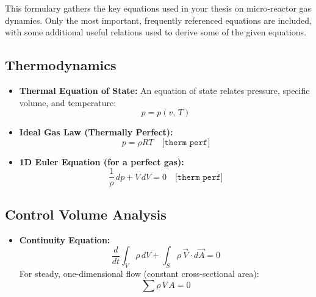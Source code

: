 This formulary gathers the key equations used in your thesis on micro-reactor gas dynamics.
Only the most important, frequently referenced equations are included, with some additional useful relations used to derive some of the given equations.

\subsection*{Thermodynamics}
\begin{itemize}
    \item \textbf{Thermal Equation of State:}  
    An equation of state relates pressure, specific volume, and temperature:
    $$
	    p = p(v,\,T)
    $$
    \item \textbf{Ideal Gas Law (Thermally Perfect):}  
    $$
	    p = \rho R T \quad \texttt{[therm perf]}
    $$
    \item \textbf{1D Euler Equation (for a perfect gas):}  
    $$
	    \frac{1}{\rho}\,dp + V\,dV = 0 \quad \texttt{[therm perf]}
    $$
\end{itemize}

\subsection*{Control Volume Analysis}
\begin{itemize}
    \item \textbf{Continuity Equation:}  
    $$
	    \frac{d}{dt} \int_V \rho\,dV + \int_S \rho\, \vec{V}\cdot d\vec{A} = 0
    $$
    For steady, one-dimensional flow (constant cross-sectional area):
    $$
		\sum \rho\,V\,A = 0
    $$
\end{itemize}

